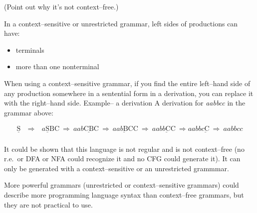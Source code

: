 \documentclass[12pt]{article}
\newcommand{\str}[1]{\emph{\textrm{#1}}}
\newcommand{\mathstr}[1]{\ensuremath{\mathit{#1}}}
\begin{document}
      \medskip

      (Point out why it's not context--free.)

      In a context--sensitive or unrestricted grammar, left sides of
      productions can have:

      \vspace{-1mm}

      \begin{itemize}

        \addtolength{\itemsep}{-1.5mm}

        \item terminals

        \item more than one nonterminal

      \end{itemize}

      \vspace{-1mm}

      When using a context--sensitive grammar, if you find the entire
      left--hand side of any production somewhere in a sentential form in a
      derivation, you can replace it with the right--hand side.  Example-- a
      derivation A derivation for \str{aabbcc} in the grammar above:

      \vspace{-6mm}

      \begin{eqnarray*}
        \mathrm{\underline{S}}
          & \ \Longrightarrow \
          & \mathrm{\mathstr{a}\underline{S}BC \ \Longrightarrow \
                    \mathstr{aab}\underline{CB}C \ \Longrightarrow \
                    \mathstr{aa}\underline{\mathstr{b}B}CC \
                    \Longrightarrow \
                    \mathstr{aab}\underline{\mathstr{b}C}C \
                    \Longrightarrow
                    \mathstr{aabb}\underline{\mathstr{c}C} \
                    \Longrightarrow \ \mathstr{aabbcc}
            }
            \\
      \end{eqnarray*}

      \vspace{-5mm}

      It could be shown that this language is not regular and is not
      context--free (no r.e.\ or DFA or NFA could recognize it and no CFG
      could generate it).  It can only be generated with a
      context--sensitive or an unrestricted grammmar.

      More powerful grammars (unrestricted or context--sensitive grammars)
      could describe more programming language syntax than context--free
      grammars, but they are not practical to use.
\end{document}

